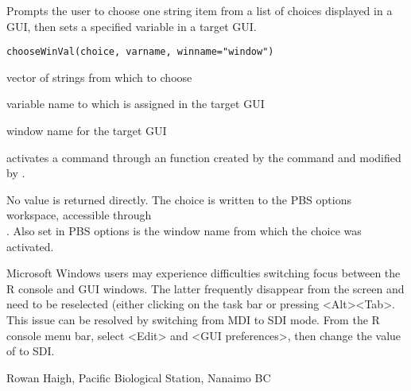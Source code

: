 \documentclass[letterpaper]{book}
\begin{document}
\begin{Description}\relax
Prompts the user to choose one string item from a list of 
choices displayed in a GUI, then sets a specified variable in 
a target GUI.
\end{Description}
\begin{Usage}
\begin{verbatim}
chooseWinVal(choice, varname, winname="window")
\end{verbatim}
\end{Usage}
\begin{Arguments}
\begin{ldescription}
\item[\code{choice}] vector of strings from which to choose 
\item[\code{varname}] variable name to which  is assigned in the target GUI 
\item[\code{winname}] window name for the target GUI 
\end{ldescription}
\end{Arguments}
\begin{Details}\relax
{} activates a  command through an
 function created by the  command and 
modified by .
\end{Details}
\begin{Value}
No value is returned directly. The choice is written to the PBS options 
workspace, accessible through \\ . Also set 
in PBS options is the window name from which the choice was activated.
\end{Value}
\begin{Note}\relax
Microsoft Windows users may experience difficulties switching focus between the 
R console and GUI windows. The latter frequently disappear from the screen and 
need to be reselected (either clicking on the task bar or pressing \textless{}Alt\textgreater{}\textless{}Tab\textgreater{}. 
This issue can be resolved by switching from MDI to SDI mode. From the R console 
menu bar, select \textless{}Edit\textgreater{} and \textless{}GUI preferences\textgreater{}, then change the value of 
 to SDI.
\end{Note}
\begin{Author}\relax
Rowan Haigh, Pacific Biological Station, Nanaimo BC
\end{Author}
\end{document}
